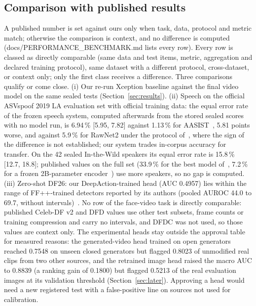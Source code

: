 \documentclass[conference,a4paper]{IEEEtran_nodash}
\begin{document}
\subsection{Comparison with published results}\label{sec:compare}
A published number is set against ours only when task, data, protocol and
metric match; otherwise the comparison is context, and no difference is
computed (docs/PERFORMANCE\_BENCHMARK.md lists every row). Every row is
classed as directly comparable (same data and test items, metric, aggregation
and declared training protocol), same dataset with a different protocol,
cross-dataset, or context only; only the first class receives a difference. Three comparisons
qualify or come close. (i) Our re-run Xception baseline against the final video
model on the same sealed tests (Section~\ref{sec:results}). (ii) Speech on the
official ASVspoof 2019 LA evaluation set with official training data: the equal
error rate of the frozen speech system, computed afterwards from the stored
sealed scores with no model run, is 6.94\,\% [5.95, 7.82] against 1.13\,\% for
AASIST~\cite{jung2021aasist}, 5.81 points worse, and against 5.9\,\% for
RawNet2 under the protocol of~\cite{pascu2024generalisable}, where the sign of
the difference is not established; our system trades in-corpus accuracy for
transfer. On the 42 sealed In-the-Wild speakers its equal error rate
is 15.8\,\% [12.7, 18.8]; published values on the full set (33.9\,\% for the
best model of~\cite{muller2022inthewild}, 7.2\,\% for a frozen 2B-parameter
encoder~\cite{pascu2024generalisable}) use more speakers, so no gap is computed.
(iii) Zero-shot DF26: our DeepAction-trained head (AUC 0.4957) lies within the
range of FF++-trained detectors reported by its authors (pooled AUROC 44.0 to
69.7, without intervals)~\cite{shykula2026df26}. %
No row of the face-video task is directly comparable: published Celeb-DF v2 and
DFD values use other test subsets, frame counts or training compression and
carry no intervals, and DFDC was not used, so those values are context only.
The experimental heads stay outside the approval table for measured reasons:
the generated-video head trained on open generators reached 0.7548 on unseen
closed generators but flagged 0.8023 of unmodified real clips from two other
sources, and the retrained image head raised the macro AUC to 0.8839 (a ranking
gain of 0.1800) but flagged 0.5213 of the real evaluation images at its
validation threshold (Section~\ref{sec:later}). Approving a head would need a
new registered test with a false-positive line on sources not used for
calibration. %
\end{document}

